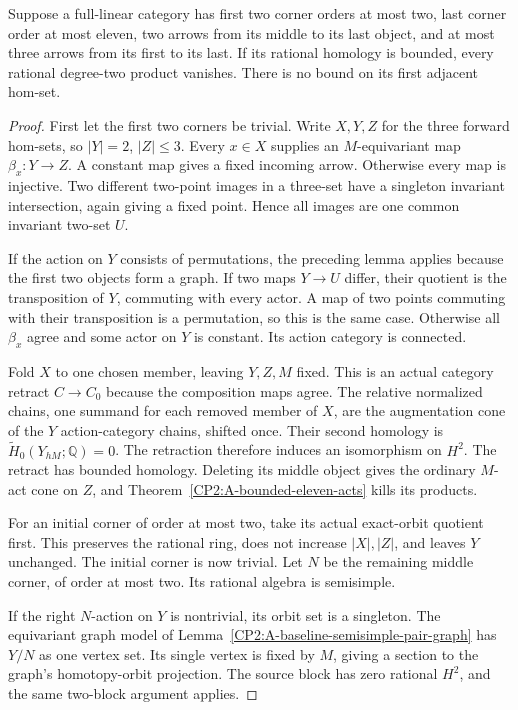 \begin{proposition}
\label{CP2:A-two-small-incoming-eleven}
Suppose a full-linear category has first two corner orders
at most two, last corner order at most eleven, two arrows
from its middle to its last object, and at most three arrows
from its first to its last. If its rational homology is
bounded, every rational degree-two product vanishes. There
is no bound on its first adjacent hom-set.
\end{proposition}
\begin{proof}
First let the first two corners be trivial. Write $X,Y,Z$
for the three forward hom-sets, so $|Y|=2$, $|Z|\leq3$.
Every $x\in X$ supplies an $M$-equivariant map
$\beta_x:Y\to Z$. A constant map gives a fixed incoming
arrow. Otherwise every map is injective. Two different
two-point images in a three-set have a singleton invariant
intersection, again giving a fixed point. Hence all images
are one common invariant two-set $U$.

If the action on $Y$ consists of permutations, the preceding
lemma applies because the first two objects form a graph.
If two maps $Y\to U$ differ, their quotient is the
transposition of $Y$, commuting with every actor. A map of
two points commuting with their transposition is a
permutation, so this is the same case. Otherwise all
$\beta_x$ agree and some actor on $Y$ is constant. Its
action category is connected.

Fold $X$ to one chosen member, leaving $Y,Z,M$ fixed.
This is an actual category retract $C\to C_0$ because the
composition maps agree. The relative normalized chains,
one summand for each removed member of $X$, are the
augmentation cone of the $Y$ action-category chains,
shifted once. Their second homology is
$\widetilde H_0(Y_{hM};\mathbb Q)=0$. The retraction
therefore induces an isomorphism on $H^2$. The retract
has bounded homology. Deleting its middle object gives
the ordinary $M$-act cone on $Z$, and
Theorem~\ref{CP2:A-bounded-eleven-acts} kills its products.

For an initial corner of order at most two, take its
actual exact-orbit quotient first. This preserves the
rational ring, does not increase $|X|,|Z|$, and leaves
$Y$ unchanged. The initial corner is now trivial.
Let $N$ be the remaining middle corner, of order at most
two. Its rational algebra is semisimple.

If the right $N$-action on $Y$ is nontrivial, its orbit
set is a singleton. The equivariant graph model of
Lemma~\ref{CP2:A-baseline-semisimple-pair-graph} has
$Y/N$ as one vertex set. Its single vertex is fixed by
$M$, giving a section to the graph's homotopy-orbit
projection. The source block has zero rational $H^2$,
and the same two-block argument applies.


\end{proof}
